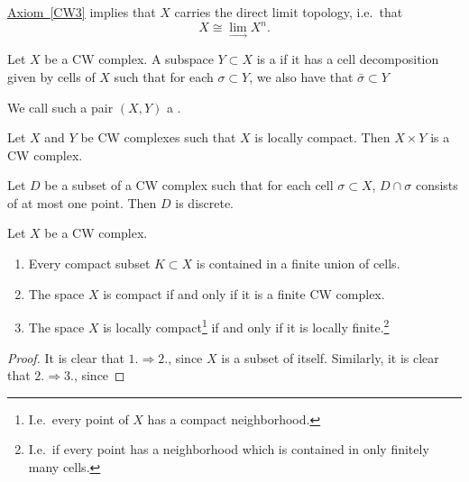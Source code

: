 \documentclass[main.tex]{subfiles}
\begin{document}
\begin{note}
  \hyperref[CW3]{Axiom~\ref*{CW3}} implies that $X$ carries the direct limit topology, i.e.\ that
  \begin{equation*}
    X \cong \lim_{\rightarrow} X^{n}.
  \end{equation*}
\end{note}

\begin{definition}
  \label{def:subcomplex}
  Let $X$ be a CW complex. A subspace $Y \subset X$ is a  if it has a cell decomposition given by cells of $X$ such that for each $\sigma \subset Y$, we also have that $\bar{\sigma} \subset Y$

  We call such a pair $(X, Y)$ a .
\end{definition}

\begin{fact}
  \label{fact:product_of_cw_complexes}
  Let $X$ and $Y$ be CW complexes such that $X$ is locally compact. Then $X \times Y$ is a CW complex.
\end{fact}

\begin{lemma}
  \label{lemma:subset_intersecting_each_cell_once_discrete}
  Let $D$ be a subset of a CW complex such that for each cell $\sigma \subset X$, $D \cap \sigma$ consists of at most one point. Then $D$ is discrete.
\end{lemma}

\begin{corollary}
  Let $X$ be a CW complex.
  \begin{enumerate}
    \item Every compact subset $K \subset X$ is contained in a finite union of cells.

    \item The space $X$ is compact if and only if it is a finite CW complex.

    \item The space $X$ is locally compact\footnote{I.e.\ every point of $X$ has a compact neighborhood.} if and only if it is locally finite.\footnote{I.e.\ if every point has a neighborhood which is contained in only finitely many cells.}
  \end{enumerate}
\end{corollary}
\begin{proof}
  It is clear that $1. \Rightarrow 2.$, since $X$ is a subset of itself. Similarly, it is clear that $2. \Rightarrow 3.$, since
\end{proof}
\end{document}
